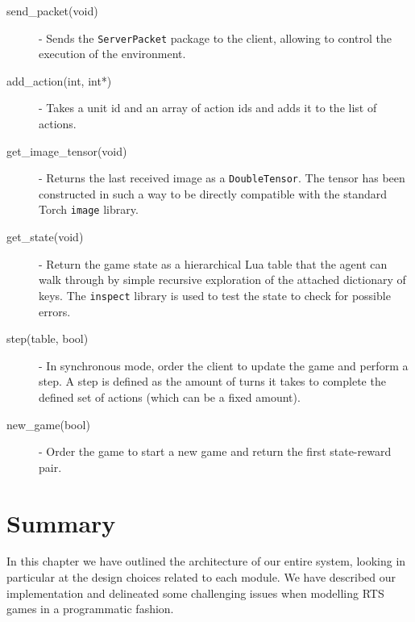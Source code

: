 \begin{description}
\item [send\_packet(void)] - Sends the \texttt{ServerPacket} package to the
  client, allowing to control the execution of the environment.
\item [add\_action(int, int*)] - Takes a unit id and an array of action ids and
  adds it to the list of actions.
\item [get\_image\_tensor(void)] - Returns the last received image as a
  \texttt{DoubleTensor}. The tensor has been constructed in such a way to be
  directly compatible with the standard Torch \texttt{image} library. 
\item [get\_state(void)] - Return the game state as a hierarchical Lua table
  that the agent can walk through by simple recursive exploration of the
  attached dictionary of keys. The \texttt{inspect} library is used to test the
  state to check for possible errors.
\item [step(table, bool)] - In synchronous mode, order the client to update the
  game and perform a step. A step is defined as the amount of turns it takes to
  complete the defined set of actions (which can be a fixed amount).
\item [new\_game(bool)] - Order the game to start a new game and return the
  first state-reward pair.
\end{description}
 
\section{Summary}

In this chapter we have outlined the architecture of our entire system, looking
in particular at the design choices related to each module. We have described
our implementation and delineated some challenging issues when modelling RTS
games in a programmatic fashion.
